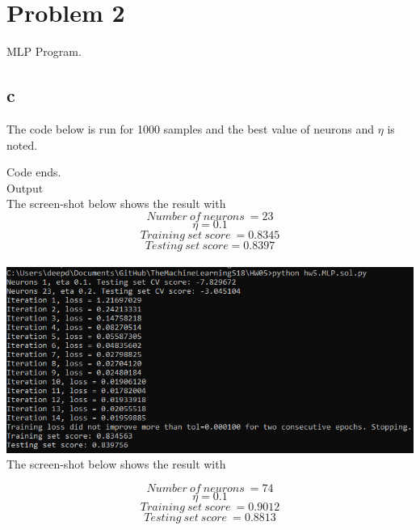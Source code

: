 \documentclass[10pt]{article}         %
\begin{document}
\newpage
\section{Problem 2}
MLP Program. 
\subsection{c}
The code below is run for 1000 samples and the best value of neurons and $\eta$ is noted.

Code ends. 
\\Output\\
The screen-shot below shows the result with  
$$ Number\ of\ neurons\ = 23 $$
$$ \eta = 0.1$$
$$ Training\ set\ score\ = 0.8345 $$
$$ Testing\ set\ score = 0.8397 $$
\\\includegraphics[scale=0.55]{hw51k_n23.PNG}
\\The screen-shot below shows the result with

$$ Number\ of\ neurons\ = 74 $$
$$ \eta = 0.1 $$
$$ Training\ set\ score\ = 0.9012 $$
$$ Testing\ set\ score\ = 0.8813 $$
\end{document}
